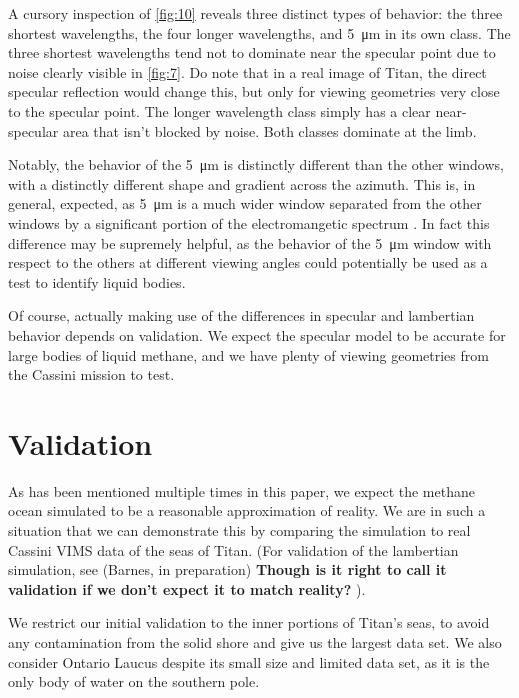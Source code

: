 \documentclass{article}
\begin{document}
A cursory inspection of \ref{fig:10} reveals three distinct types of behavior: the three shortest wavelengths, the four longer wavelengths, and \qty{5}{\micro\meter} in its own class. The three shortest wavelengths tend not to dominate near the specular point due to noise clearly visible in \ref{fig:7}. Do note that in a real image of Titan, the direct specular reflection would change this, but only for viewing geometries very close to the specular point. The longer wavelength class simply has a clear near-specular area that isn't blocked by noise. Both classes dominate at the limb. 

Notably, the behavior of the \qty{5}{\micro\meter} is distinctly different than the other windows, with a distinctly different shape and gradient across the azimuth. This is, in general, expected, as \qty{5}{\micro\meter} is a much wider window separated from the other windows by a significant portion of the electromangetic spectrum \cite{EsSayeh2023}. In fact this difference may be supremely helpful, as the behavior of the \qty{5}{\micro\meter} window with respect to the others at different viewing angles could potentially be used as a test to identify liquid bodies. 

Of course, actually making use of the differences in specular and lambertian behavior depends on validation. We expect the specular model to be accurate for large bodies of liquid methane, and we have plenty of viewing geometries from the Cassini mission to test.

\section{Validation}

As has been mentioned multiple times in this paper, we expect the methane ocean simulated to be a reasonable approximation of reality. We are in such a situation that we can demonstrate this by comparing the simulation to real Cassini VIMS data of the seas of Titan. (For validation of the lambertian simulation, see (Barnes, in preparation) \textbf{\color{red} Though is it right to call it validation if we don't expect it to match reality? \color{black}}). 

We restrict our initial validation to the inner portions of Titan's seas, to avoid any contamination from the solid shore and give us the largest data set. We also consider Ontario Laucus despite its small size and limited data set, as it is the only body of water on the southern pole. 
\end{document}
